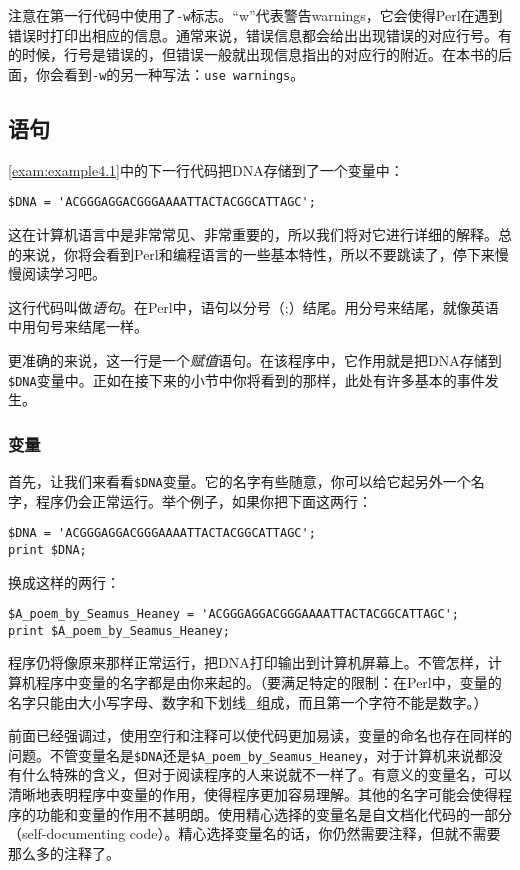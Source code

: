 注意在第一行代码中使用了\verb|-w|标志。“w”代表警告warnings，它会使得Perl在遇到错误时打印出相应的信息。通常来说，错误信息都会给出出现错误的对应行号。有的时候，行号是错误的，但错误一般就出现信息指出的对应行的附近。在本书的后面，你会看到\verb|-w|的另一种写法：\verb|use warnings|。

\subsection{语句}
\autoref{exam:example4.1}中的下一行代码把DNA存储到了一个变量中：

\begin{lstlisting}
$DNA = 'ACGGGAGGACGGGAAAATTACTACGGCATTAGC';
\end{lstlisting}

这在计算机语言中是非常常见、非常重要的，所以我们将对它进行详细的解释。总的来说，你将会看到Perl和编程语言的一些基本特性，所以不要跳读了，停下来慢慢阅读学习吧。

这行代码叫做\textit{语句}。在Perl中，语句以分号（;）结尾。用分号来结尾，就像英语中用句号来结尾一样。

更准确的来说，这一行是一个\textit{赋值}语句。在该程序中，它作用就是把DNA存储到\verb|$DNA|变量中。正如在接下来的小节中你将看到的那样，此处有许多基本的事件发生。

\subsubsection{变量}
首先，让我们来看看\verb|$DNA|变量。它的名字有些随意，你可以给它起另外一个名字，程序仍会正常运行。举个例子，如果你把下面这两行：

\begin{lstlisting}
$DNA = 'ACGGGAGGACGGGAAAATTACTACGGCATTAGC';
print $DNA;
\end{lstlisting}
换成这样的两行：

\begin{lstlisting}
$A_poem_by_Seamus_Heaney = 'ACGGGAGGACGGGAAAATTACTACGGCATTAGC';
print $A_poem_by_Seamus_Heaney;
\end{lstlisting}
程序仍将像原来那样正常运行，把DNA打印输出到计算机屏幕上。不管怎样，计算机程序中变量的名字都是由你来起的。（要满足特定的限制：在Perl中，变量的名字只能由大小写字母、数字和下划线\_组成，而且第一个字符不能是数字。）

前面已经强调过，使用空行和注释可以使代码更加易读，变量的命名也存在同样的问题。不管变量名是\verb|$DNA|还是\verb|$A_poem_by_Seamus_Heaney|，对于计算机来说都没有什么特殊的含义，但对于阅读程序的人来说就不一样了。有意义的变量名，可以清晰地表明程序中变量的作用，使得程序更加容易理解。其他的名字可能会使得程序的功能和变量的作用不甚明朗。使用精心选择的变量名是自文档化代码的一部分（self-documenting code）。精心选择变量名的话，你仍然需要注释，但就不需要那么多的注释了。

